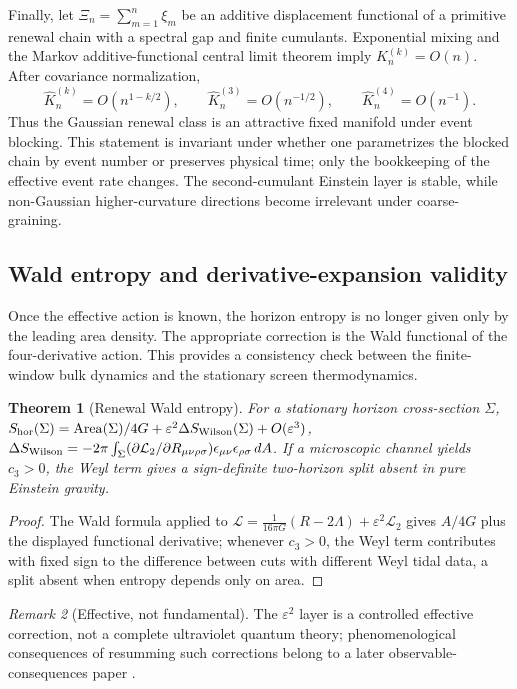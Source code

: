 \documentclass[11pt]{article}
\newtheorem{theorem}{Theorem}[section]
\theoremstyle{definition}
\theoremstyle{remark}
\newtheorem{remark}[theorem]{Remark}
\newcommand{\eps}{\varepsilon}
\newcommand{\Area}{\operatorname{Area}}
\newcommand{\Lcal}{\mathcal L}
\newcommand{\hor}{\mathrm{hor}}
\begin{document}
Finally, let $\Xi_n=\sum_{m=1}^n\xi_m$ be an additive displacement functional of
a primitive renewal chain with a spectral gap and finite cumulants.  Exponential
mixing and the Markov additive-functional central limit theorem imply
$K_n^{(k)}=O(n)$.  After covariance normalization,
\[
 \widehat K_n^{(k)}=O\!\left(n^{1-k/2}\right),\qquad
 \widehat K_n^{(3)}=O(n^{-1/2}),\qquad
 \widehat K_n^{(4)}=O(n^{-1}).
\]
Thus the Gaussian renewal class is an attractive fixed manifold under event
blocking.  This statement is invariant under whether one parametrizes the
blocked chain by event number or preserves physical time; only the bookkeeping
of the effective event rate changes.  The second-cumulant Einstein layer is
stable, while non-Gaussian higher-curvature directions become irrelevant under
coarse-graining.


\subsection{Wald entropy and derivative-expansion validity}

Once the effective action is known, the horizon entropy is no longer given only
by the leading area density.  The appropriate correction is the Wald functional
of the four-derivative action.  This provides a consistency check between the
finite-window bulk dynamics and the stationary screen thermodynamics.

\begin{theorem}[Renewal Wald entropy]
\label{thm:wald}
For a stationary horizon cross-section $\Sigma$,
$S_{\hor}(\Sigma)=\Area(\Sigma)/4G+\eps^2\Delta S_{\rm Wilson}(\Sigma)+O(\eps^3)$,
$\Delta S_{\rm Wilson}=-2\pi\int_\Sigma(\partial\Lcal_2/\partial R_{\mu\nu\rho\sigma})
\epsilon_{\mu\nu}\epsilon_{\rho\sigma}\,dA$.  If a microscopic channel yields $c_3>0$, the Weyl term gives a sign-definite
two-horizon split absent in pure Einstein gravity.
\end{theorem}

\begin{proof}
The Wald formula \cite{WaldEntropy,IyerWald} applied to
$\Lcal=\tfrac1{16\pi G}(R-2\Lambda)+\eps^2\Lcal_2$ gives $A/4G$ plus the displayed
functional derivative; whenever $c_3>0$, the Weyl term contributes with fixed sign to the
difference between cuts with different Weyl tidal data, a split absent when entropy
depends only on area.
\end{proof}

\begin{remark}[Effective, not fundamental]
The $\eps^2$ layer is a controlled effective correction, not a complete ultraviolet
quantum theory; phenomenological consequences of resumming such corrections belong to
a later observable-consequences paper \cite{PelissierPhenomenology}.
\end{remark}
\end{document}
